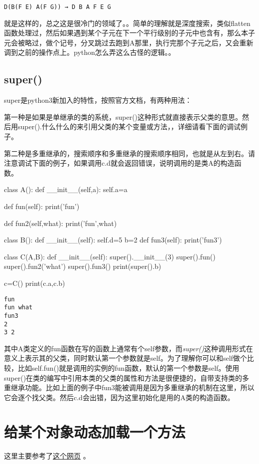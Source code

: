 \documentclass[12pt,oneside]{book}
\begin{document}
\begin{common-format}
\begin{Verbatim}
D(B(F E) A(F G)) → D B A F E G
\end{Verbatim}
就是这样的，总之这是很冷门的领域了。。简单的理解就是深度搜索，类似flatten函数处理过，然后如果遇到某个子元在下一个平行级别的子元中也含有，那么本子元会被略过，做个记号，分叉跳过去跑到A那里，执行完那个子元之后，又会重新调到之前的操作点上。python怎么弄这么古怪的逻辑。。



\subsection{super()}
super是python3新加入的特性，按照官方文档，有两种用法：

第一种是如果是单继承的类的系统，super()这种形式就直接表示父类的意思。然后用super().什么什么的来引用父类的某个变量或方法，，详细请看下面的调试例子。

第二种是多重继承的，搜索顺序和多重继承的搜索顺序相同，也就是从左到右。请注意调试下面的例子，如果调用c.d就会返回错误，说明调用的是类A的构造函数。

\begin{tcbpython}[]
class A():
    def __init__(self,a):
        self.a=a

    def fun(self):
        print('fun')

    def fun2(self,what):
        print('fun',what)

class B():
    def __init__(self):
        self.d=5
    b=2
    def fun3(self):
        print('fun3')

class C(A,B):
    def __init__(self):
        super().__init__(3)
        super().fun()
        super().fun2('what')
        super().fun3()
        print(super().b)

c=C()
print(c.a,c.b)
\end{tcbpython}

\begin{Verbatim}
fun
fun what
fun3
2
3 2
\end{Verbatim}


其中A类定义的fun函数在写的函数上通常有个self参数，而\emph{super()}这种调用形式在意义上表示其的父类，同时默认第一个参数就是self。为了理解你可以和self做个比较，比如self.fun()就是调用的实例的fun函数，默认的第一个参数是self。使用super()在类的编写中引用本类的父类的属性和方法是很便捷的，自带支持类的多重继承功能。比如上面的例子中fun3能被调用是因为多重继承的机制在这里，所以它会逐个找父类。然后c.d会出错，因为这里初始化是用的A类的构造函数。


\section{给某个对象动态加载一个方法}
这里主要参考了\href{http://stackoverflow.com/questions/962962/python-changing-methods-and-attributes-at-runtime}{这个网页} 。


\end{common-format}
\end{document}
